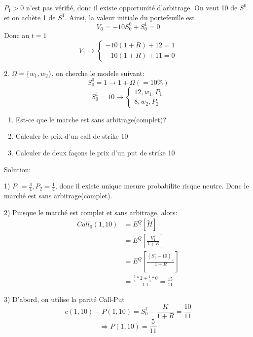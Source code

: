 \documentclass{article}
\theoremstyle{plain}
\theoremstyle{definition}
\begin{document}
$P_1>0$ n'est pas v\'erifi\'e, donc il existe opportunit\'e d'arbitrage.
On veut 10 de $S^0$ et on ach\`ete 1 de $S^1$. Ainsi, la valeur initiale du portefeuille est
\begin{equation}
	V_0=-10S_0^0+S_0^1=0
\end{equation}
Donc au $t=1$
\begin{equation}
V_1\rightarrow
\left\{\begin{array}{rc}
	-10(1+R)+12=1\\
	-10(1+R)+11=0
\end{array}\right.
\end{equation}

2. $\Omega=\{w_1, w_2\}$, on cherche le modele suivant:
\begin{equation}
	S_0^0=1 \rightarrow 1+\Omega(=10\%)
\end{equation}
\begin{equation}
	S_0^1=10\rightarrow
	\left\{\begin{array}{rc}
		12, w_1, P_1\\
		8, w_2, P_2
	\end{array}\right.
\end{equation}

\begin{enumerate}
\item Est-ce que le marche est sans arbitrage(complet)?
\item Calculer le prix d'un call de strike 10
\item Calculer de deux fa\c{c}ons le prix d'un put de strike 10
\end{enumerate}

Solution:

1) $P_1=\frac{3}{4}, P_2=\frac{1}{4}$, donc il existe unique mesure probabilite risque neutre. Donc le march\'e est sans arbitrage(complet).

2) Puisque le march\'e est complet et sans arbitrage, alors:
\begin{equation}
\begin{split}
	Call_0(1,10) &= E^Q[\tilde{H}] \\
	&= E^Q[\frac{V_1^\theta}{1+R}] \\
	&= E^Q[\frac{(S_1^1-10)_+}{1+R}]\\
	&=\frac{\frac{3}{4}*2+\frac{1}{4}*0}{1.1}=\frac{15}{11}
\end{split}
\end{equation}

3) 
D'abord, on utilise la parit\'e Call-Put
\begin{equation}
c(1,10)-P(1,10)=S_0^1-\frac{K}{1+R}=\frac{10}{11}
\end{equation}
\begin{equation}
\Rightarrow P(1,10)=\frac{5}{11}
\end{equation}
\end{document}
